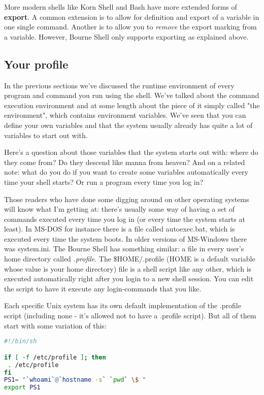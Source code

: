 More modern shells like Korn Shell and Bash have more extended forms of
\textbf{export}. A common extension is to allow for definition and export of a
variable in one single command. Another is to allow you to \textit{remove} the
export marking from a variable. However, Bourne Shell only supports exporting
as explained above.

\subsection{Your profile} In the previous sections we've discussed the
runtime environment of every program and command you run using the shell. We've
talked about the command execution environment and at some length about the
piece of it simply called "the environment", which contains environment
variables. We've seen that you can define your own variables and that the
system usually already has quite a lot of variables to start out with.

Here's a question about those variables that the system starts out with: where
do they come from? Do they descend like manna from heaven? And on a related
note: what do you do if you want to create some variables automatically every
time your shell starts? Or run a program every time you log in?

Those readers who have done some digging around on other operating systems will
know what I'm getting at: there's usually some way of having a set of commands
executed every time you log in (or every time the system starts at least). In
MS-DOS for instance there is a file called autoexec.bat, which is executed
every time the system boots. In older versions of MS-Windows there was
system.ini. The Bourne Shell has something similar: a file in every user's home
directory called \textit{.profile}. The \$HOME/.profile (HOME is a default
variable whose value is your home directory) file is a shell script like any
other, which is executed automatically right after you login to a new shell
session. You can edit the script to have it execute any login-commands that you
like.

Each specific Unix system has its own default implementation of the .profile
script (including none - it's allowed not to have a .profile script). But all
of them start with some variation of this:
\lstset{basicstyle=\scriptsize, numbers=left, captionpos=b, tabsize=4}
\begin{lstlisting}[caption=A basic (but typical) HOME profile,language={bash},
xleftmargin=15pt,label=lst:A basic (but typical) HOME profile]
#!/bin/sh

if [ -f /etc/profile ]; then
 . /etc/profile
fi
PS1= "`whoami`@`hostname -s` `pwd` \$ "
export PS1
\end{lstlisting}

